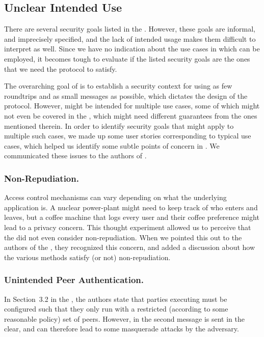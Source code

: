 \documentclass[runningheads]{llncs}
\begin{document}
\subsection{Unclear Intended Use}
\label{sec:unclearProtocolUse}
%
There are several security goals listed in the \mSpec{}.
%
However, these goals are informal, and imprecisely specified, and the lack of intended usage makes them difficult to interpret as well.
%
Since we have no indication about the use cases in which \mEdhoc{} can be employed, it becomes tough to evaluate if the listed security goals are the ones that we need the protocol to satisfy.

The overarching goal of \mEdhoc{} is to establish a security context for \mOscore{} using as few roundtrips and as small messages as possible, which dictates the design of the protocol.
%
However, \mEdhoc{} might be intended for multiple use cases, some of which might not even be covered in the \mSpec{}, which might need different guarantees from the ones mentioned therein.
%
In order to identify security goals that might apply to multiple such cases, we made up some user stories corresponding to typical use cases, which helped us identify some subtle points of concern in \mEdhoc.
%
We communicated these issues to the authors of \mEdhoc{}.
%

\subsubsection{Non-Repudiation.}
Access control mechanisms can vary depending on what the underlying application is.
%
A nuclear power-plant might need to keep track of who enters and leaves, but a coffee machine that logs every user and their coffee preference might lead to a privacy concern.
%
This thought experiment allowed us to perceive that the \mEdhoc{} \mSpec{} did not even consider non-repudiation.
%
When we pointed this out to the authors of the \mSpec, they recognized this concern, and added a discussion about how the various \mEdhoc{} methods satisfy (or not) non-repudiation.

\subsubsection{Unintended Peer Authentication.}
\label{sec:unintendedPeerAuth}
In Section~3.2 in the \mSpec{}, the authors state that parties executing \mEdhoc{} must be configured such that they only run \mEdhoc{} with a restricted (according to some reasonable policy) set of peers.
%
However, \mIdcredr{} in the second message is sent in the clear, and can therefore lead to some masquerade attacks by the adversary.
%
\end{document}
